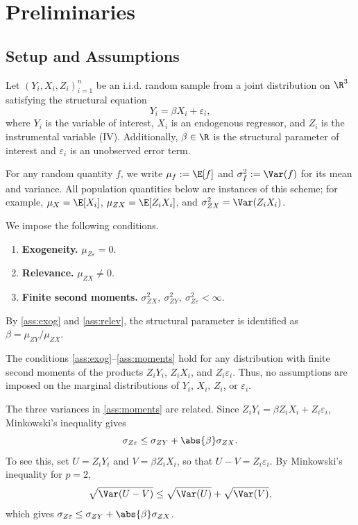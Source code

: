 \section{Preliminaries}


\subsection{Setup and Assumptions}
Let $(Y_i, X_i, Z_i)_{i=1}^{n}$ be an i.i.d. random sample from a joint distribution on $\R^3$ satisfying the structural equation
\begin{equation}
\label{eq:structural}
    Y_i = \beta X_i + \varepsilon_i,
\end{equation}
where $Y_i$ is the variable of interest, $X_i$ is an endogenous regressor, and $Z_i$ is the instrumental variable (IV). Additionally, $\beta \in \R$ is the structural parameter of interest and $\varepsilon_i$ is an unobserved error term. 

For any random quantity $f$, we write $\mu_f := \E[f]$ and $\sigma_f^2 := \Var(f)$ for its mean and variance. All population quantities below are instances of this scheme; for example, $\mu_X = \E[X_i]$, $\mu_{ZX} = \E[Z_i X_i]$, and $\sigma_{ZX}^2 = \Var(Z_i X_i)$.

We impose the following conditions.
\begin{enumerate}[label=(A\arabic*)]
    \item \label{ass:exog} \textbf{Exogeneity.} $\mu_{Z\varepsilon} = 0$.
    \item \label{ass:relev} \textbf{Relevance.} $\mu_{ZX} \neq 0$.
    \item \label{ass:moments} \textbf{Finite second moments.} $\sigma_{ZX}^2,\ \sigma_{ZY}^2,\ \sigma_{Z\varepsilon}^2 < \infty$.
\end{enumerate}

By \ref{ass:exog} and \ref{ass:relev}, the structural parameter is identified as $\beta = \mu_{ZY}/\mu_{ZX}$.

\begin{remark}
The conditions \ref{ass:exog}--\ref{ass:moments} hold for any distribution with finite second moments of the products $Z_iY_i$, $Z_iX_i$, and $Z_i\varepsilon_i$. Thus, no assumptions are imposed on the marginal distributions of $Y_i$, $X_i$, $Z_i$, or $\varepsilon_i$.
\end{remark}

\begin{remark}
\label{rem:minkowski}
The three variances in \ref{ass:moments} are related. Since $Z_i Y_i = \beta Z_i X_i + Z_i\varepsilon_i$, Minkowski's inequality gives
\begin{equation}
\label{eq:minkowski}
    \sigma_{Z\varepsilon} \leq \sigma_{ZY} + \abs{\beta}\sigma_{ZX}.
\end{equation}
To see this, set $U = Z_i Y_i$ and $V = \beta Z_i X_i$, so that $U - V = Z_i\varepsilon_i$. By Minkowski's inequality for $p = 2$,
\[
    \sqrt{\Var(U - V)} \leq \sqrt{\Var(U)} + \sqrt{\Var(V)},
\]
which gives $\sigma_{Z\varepsilon} \leq \sigma_{ZY} + \abs{\beta}\sigma_{ZX}$.
\end{remark}


